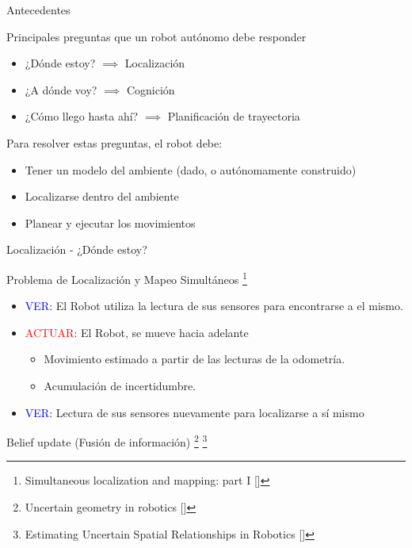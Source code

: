 \documentclass[
  24pt, %
  aspectratio=169, %
]{beamer}
\begin{document}
\begin{frame}{Antecedentes}
  
  Principales preguntas que un robot autónomo debe responder \footnotemark
  \bigskip %
  \begin{itemize}
  \item ¿Dónde estoy? $\implies$ Localización 
  \item ¿A dónde voy? $\implies$ Cognición
  \item ¿Cómo llego hasta ahí? $\implies$ Planificación de trayectoria
  \end{itemize}
  \pause
  \bigskip %
  Para resolver estas preguntas, el robot debe:
  \bigskip %
  \begin{itemize}
  \item Tener un modelo del ambiente (dado, o autónomamente construido)
  \item Localizarse dentro del ambiente
  \item Planear y ejecutar los movimientos
  \end{itemize}

  
\end{frame}

\begin{frame}{Localización - ¿Dónde estoy?}

  Problema de Localización y Mapeo Simultáneos  \footnote{Simultaneous localization and mapping: part I [\cite{slam_doc}]}
  \bigskip %
  \begin{itemize}
    \item \textcolor{blue}{VER}: El Robot utiliza la lectura de sus sensores para encontrarse a el mismo.
      \bigskip %
    \item \textcolor{red}{ACTUAR}: El Robot, se mueve hacia adelante
      \begin{itemize}
      \item Movimiento estimado a partir de las lecturas de la odometría.
      \item Acumulación de incertidumbre.
      \end{itemize}
      \bigskip %
    \item \textcolor{blue}{VER}: Lectura de sus sensores nuevamente para localizarse a sí mismo
  \end{itemize}
      
  \bigskip %
  Belief update (Fusión de información) \footnote{Uncertain geometry in robotics [\cite{slam_dur}]} \footnote{Estimating Uncertain Spatial Relationships in Robotics [\cite{Smith1988}]}
  
\end{frame}
\end{document}

